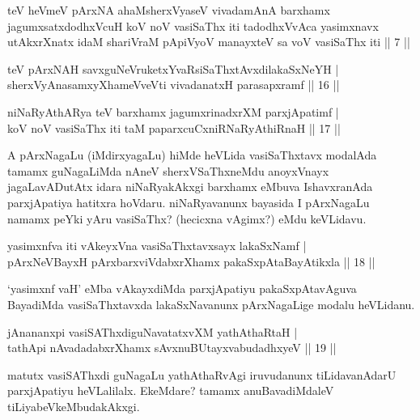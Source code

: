 \begin{kandikeshl}
teV heVmeV pArxNA ahaMsherxVyaseV vivadamAnA barxhamx jagumxsatxdodhxVcuH koV noV vasiSaThx iti tadodhxVvAca yasimxnavx utAkxrXnatx idaM shariVraM pApiVyoV manayxteV sa voV vasiSaThx iti || 7 ||
\end{kandikeshl}


\begin{shl}
teV pArxNAH savxguNeVruketxYvaRsiSaThxtAvxdilakaSxNeYH | \\
sherxVyAnasamxyXhameVveVti vivadanatxH parasapxramf \hfill|| 16 || 
\end{shl}

\begin{shl}
niNaRyAthARya teV barxhamx jagumxrinadxrXM parxjApatimf | \\
koV noV vasiSaThx iti taM paparxcuCxniRNaRyAthiRnaH \hfill|| 17 || 
\end{shl}

\begin{artha}
A pArxNagaLu (iMdirxyagaLu) hiMde heVLida vasiSaThxtavx modalAda 
tamamx guNagaLiMda nAneV sherxVSaThxneMdu anoyxVnayx jagaLavADutAtx 
idara niNaRyakAkxgi barxhamx eMbuva IshavxranAda parxjApatiya hatitxra 
hoVdaru. niNaRyavanunx bayasida I pArxNagaLu namamx peYki yAru 
vasiSaThx? (hecicxna vAgimx?) eMdu keVLidavu.
\end{artha}


\begin{shl}
yasimxnfva iti vAkeyxVna vasiSaThxtavxsayx lakaSxNamf | \\
pArxNeVBayxH pArxbarxviVdabxrXhamx pakaSxpAtaBayAtikxla \hfill|| 18 || 
\end{shl}


\begin{artha}
`yasimxnf vaH' eMba vAkayxdiMda parxjApatiyu pakaSxpAtavAguva 
BayadiMda vasiSaThxtavxda lakaSxNavanunx pArxNagaLige modalu 
heVLidanu.
\end{artha}

\begin{shl}
jAnananxpi vasiSAThxdiguNavatatxvXM yathAthaRtaH | \\
tathA\s pi nAvadadabxrXhamx sAvxnuBUtayxvabudadhxyeV \hfill|| 19 || 
\end{shl}

\begin{artha}
matutx vasiSAThxdi guNagaLu yathAthaRvAgi iruvudanunx tiLidavanAdarU 
parxjApatiyu heVLalilalx. EkeMdare? tamamx anuBavadiMdaleV 
tiLiyabeVkeMbudakAkxgi.
\end{artha}

